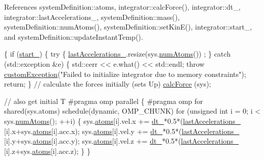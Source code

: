 References system\-Definition\-::atoms, integrator\-::calc\-Force(), integrator\-::dt\-\_\-, integrator\-::last\-Accelerations\-\_\-, system\-Definition\-::mass(), system\-Definition\-::num\-Atoms(), system\-Definition\-::set\-Kin\-E(), integrator\-::start\-\_\-, and system\-Definition\-::update\-Instant\-Temp().


\begin{DoxyCode}
                                     \{
    \textcolor{keywordflow}{if} (\hyperlink{classintegrator_a5b3546a765d8a83b6db8a6d890ace480}{start\_}) \{
        \textcolor{keywordflow}{try} \{
            \hyperlink{classintegrator_a3e183a65eb6a777479dca47e7f9a2676}{lastAccelerations\_}.resize(sys.\hyperlink{classsystem_definition_ae8d3c2df2d56241cee03fcc4e2026ae0}{numAtoms}())
      ;
        \} \textcolor{keywordflow}{catch} (std::exception &e) \{
            std::cerr << e.what() << std::endl;
            \textcolor{keywordflow}{throw} \hyperlink{classcustom_exception}{customException}(\textcolor{stringliteral}{"Failed to initialize
       integrator due to memory constraints"});
            \textcolor{keywordflow}{return};
        \}
        \textcolor{comment}{// calculate the forces initially (sets Up)}
        \hyperlink{classintegrator_ad630bf7c9b7339fa34f36fe43b0d9e3c}{calcForce} (sys);
        
        \textcolor{comment}{// also get initial T}
\textcolor{preprocessor}{        #pragma omp parallel}
\textcolor{preprocessor}{}        \{
\textcolor{preprocessor}{            #pragma omp for shared(sys.atoms) schedule(dynamic, OMP\_CHUNK) }
\textcolor{preprocessor}{}            \textcolor{keywordflow}{for} (\textcolor{keywordtype}{unsigned} \textcolor{keywordtype}{int} i = 0; i < sys.\hyperlink{classsystem_definition_ae8d3c2df2d56241cee03fcc4e2026ae0}{numAtoms}(); ++i) \{
                sys.\hyperlink{classsystem_definition_ae8814d3f60fc1111af2a3f218a4bfcab}{atoms}[i].vel.x += \hyperlink{classintegrator_a6e4712b8597e3c40124316d2e9dd5051}{dt\_}*0.5*(\hyperlink{classintegrator_a3e183a65eb6a777479dca47e7f9a2676}{lastAccelerations\_}
      [i].x+sys.\hyperlink{classsystem_definition_ae8814d3f60fc1111af2a3f218a4bfcab}{atoms}[i].acc.x);
                sys.\hyperlink{classsystem_definition_ae8814d3f60fc1111af2a3f218a4bfcab}{atoms}[i].vel.y += \hyperlink{classintegrator_a6e4712b8597e3c40124316d2e9dd5051}{dt\_}*0.5*(\hyperlink{classintegrator_a3e183a65eb6a777479dca47e7f9a2676}{lastAccelerations\_}
      [i].y+sys.\hyperlink{classsystem_definition_ae8814d3f60fc1111af2a3f218a4bfcab}{atoms}[i].acc.y);
                sys.\hyperlink{classsystem_definition_ae8814d3f60fc1111af2a3f218a4bfcab}{atoms}[i].vel.z += \hyperlink{classintegrator_a6e4712b8597e3c40124316d2e9dd5051}{dt\_}*0.5*(\hyperlink{classintegrator_a3e183a65eb6a777479dca47e7f9a2676}{lastAccelerations\_}
      [i].z+sys.\hyperlink{classsystem_definition_ae8814d3f60fc1111af2a3f218a4bfcab}{atoms}[i].acc.z);
            \}
        \}
        

\end{DoxyCode}
